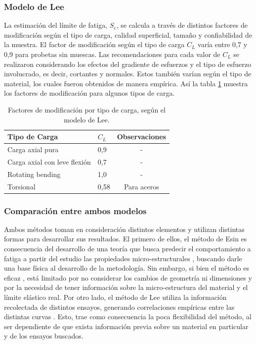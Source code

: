 \subsubsection{Modelo de Lee}
La estimación del límite de fatiga, $S_e$, se calcula a través de distintos factores de modificación según el tipo de carga, calidad superficial, tamaño y confiabilidad de la muestra. El factor de modificación según el tipo de carga $C_L$ varía entre 0,7 y 0,9 para probetas sin muescas. Las recomendaciones para cada valor de $C_L$ se realizaron considerando los efectos del gradiente de esfuerzos y el tipo de esfuerzo involucrado, es decir, cortantes y normales. Estos también varían según el tipo de material, los cuales fueron obtenidos de manera empírica. Así la tabla \ref{tab:lee_factor} muestra los factores de modificación para algunos tipos de carga.

\begin{table}[h]
\centering
\caption{Factores de modificación por tipo de carga, según el modelo de Lee.}
\begin{tabular}{@{}llc@{}}
\toprule
Tipo de Carga                & $C_L$ & Observaciones \\ \midrule
Carga axial pura             & 0,9   & -                                 \\
Carga axial con leve flexión & 0,7   & -                                 \\
Rotating bending             & 1,0   & -                                 \\
Torsional                    & 0,58  & Para aceros   \\ \bottomrule
\end{tabular}
\label{tab:lee_factor}
\end{table}

\subsubsection{Comparación entre ambos modelos}

Ambos métodos toman en consideración distintos elementos y utilizan distintas formas para desarrollar sus resultados. El primero de ellos, el método de Esin es consecuencia del desarrollo de una teoría que busca predecir el comportamiento a fatiga a partir del estudio las propiedades micro-estructurales \cite{esin1966theory}, buscando darle una base física al desarrollo de la metodología. Sin embargo, si bien el método es eficaz \cite{strzelecki2018analysis}, está limitado por no considerar los cambios de geometría ni dimensiones y por la necesidad de tener información sobre la micro-estructura del material y el límite elástico real. Por otro lado, el método de Lee utiliza la información recolectada de distintos ensayos, generando correlaciones empíricas entre las distintas curvas \cite{lee2005fatigue}. Esto, trae como consecuencia la poca flexibilidad del método, al ser dependiente de que exista información previa sobre un material en particular y de los ensayos buscados.

